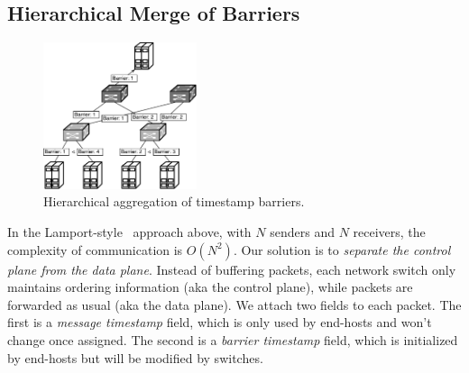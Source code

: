 


\subsection{Hierarchical Merge of Barriers}
\label{sec:ideal}

\begin{figure}[t]
\centering
\includegraphics[width=0.4\textwidth]{images/hierarchical_merge.pdf}
\caption{Hierarchical aggregation of timestamp barriers.}
\label{fig:hierarchical_merge}
\vspace{-0.9em}
\end{figure}

In the Lamport-style~\cite{lamport1978time} approach above, with $N$ senders and $N$ receivers, the complexity of communication is $O(N^2)$.
Our solution is to \textit{separate the control plane from the data plane}.
Instead of buffering packets, each network switch only maintains ordering information (aka the control plane), while packets are forwarded as usual (aka the data plane).
We attach two fields to each packet.
The first is a \textit{message timestamp} field, which is only used by end-hosts and won't change once assigned.
The second is a \textit{barrier timestamp} field, which is initialized by end-hosts but will be modified by switches.


